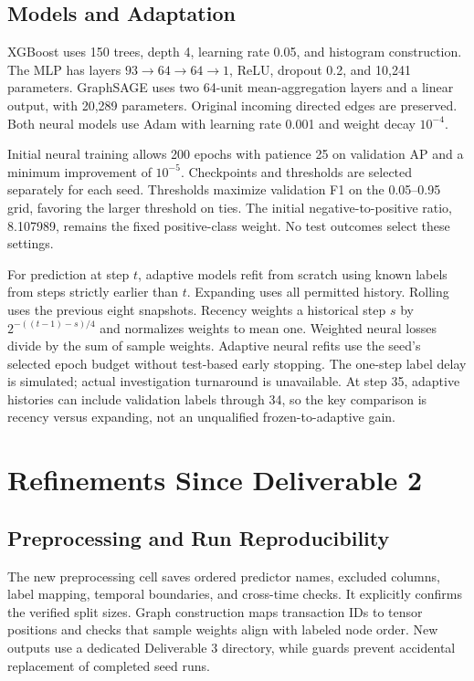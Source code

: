 \documentclass[conference]{IEEEtran}
\begin{document}
\subsection{Models and Adaptation}
XGBoost \cite{xgboost} uses 150 trees, depth 4, learning rate 0.05, and histogram construction. The MLP has layers $93\rightarrow64\rightarrow64\rightarrow1$, ReLU, dropout 0.2, and 10,241 parameters. GraphSAGE \cite{sage} uses two 64-unit mean-aggregation layers and a linear output, with 20,289 parameters. Original incoming directed edges are preserved. Both neural models use Adam with learning rate 0.001 and weight decay $10^{-4}$.

Initial neural training allows 200 epochs with patience 25 on validation AP and a minimum improvement of $10^{-5}$. Checkpoints and thresholds are selected separately for each seed. Thresholds maximize validation F1 on the 0.05--0.95 grid, favoring the larger threshold on ties. The initial negative-to-positive ratio, 8.107989, remains the fixed positive-class weight. No test outcomes select these settings.

For prediction at step $t$, adaptive models refit from scratch using known labels from steps strictly earlier than $t$. Expanding uses all permitted history. Rolling uses the previous eight snapshots. Recency weights a historical step $s$ by $2^{-((t-1)-s)/4}$ and normalizes weights to mean one. Weighted neural losses divide by the sum of sample weights. Adaptive neural refits use the seed's selected epoch budget without test-based early stopping. The one-step label delay is simulated; actual investigation turnaround is unavailable. At step 35, adaptive histories can include validation labels through 34, so the key comparison is recency versus expanding, not an unqualified frozen-to-adaptive gain.

\section{Refinements Since Deliverable 2}
\subsection{Preprocessing and Run Reproducibility}
The new preprocessing cell saves ordered predictor names, excluded columns, label mapping, temporal boundaries, and cross-time checks. It explicitly confirms the verified split sizes. Graph construction maps transaction IDs to tensor positions and checks that sample weights align with labeled node order. New outputs use a dedicated Deliverable 3 directory, while guards prevent accidental replacement of completed seed runs.
\end{document}
